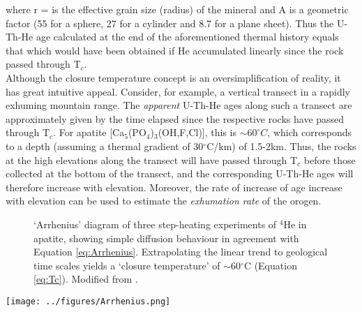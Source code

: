 where r = is the effective grain size (radius) of the mineral and A is
a geometric factor (55 for a sphere, 27 for a cylinder and 8.7 for a
plane sheet). Thus the U-Th-He age calculated at the end of the
aforementioned thermal history equals that which would have been
obtained if He accumulated linearly since the rock passed through
T$_c$.\\

Although the closure temperature concept is an oversimplification of
reality, it has great intuitive appeal. Consider, for example, a
vertical transect in a rapidly exhuming mountain range. The
\emph{apparent} U-Th-He ages along such a transect are approximately
given by the time elapsed since the respective rocks have passed
through T$_c$. For apatite [Ca$_5$(PO$_4$)$_3$(OH,F,Cl)], this is
$\sim 60^{\circ}C$, which corresponds to a depth (assuming a thermal
gradient of 30$^{\circ}$C/km) of 1.5-2km. Thus, the rocks at the high
elevations along the transect will have passed through T$_c$ before
those collected at the bottom of the transect, and the corresponding
U-Th-He ages will therefore increase with elevation. Moreover, the
rate of increase of age increase with elevation can be used to
estimate the \emph{exhumation rate} of the orogen.

\ifpdf
\ifuclnotes
\begin{figure}[!ht]
  \centering
  \def\svgwidth{.9\textwidth}
  
  \caption{`Arrhenius' diagram of three step-heating experiments of
    $^4$He in apatite, showing simple diffusion behaviour in agreement
    with Equation \ref{eq:Arrhenius}. Extrapolating the linear trend
    to geological time scales yields a `closure temperature' of
    $\sim$60$^\circ$C (Equation \ref{eq:Tc}). Modified from
    \citet{braun2006}.}
  \label{fig:Arrhenius}
\end{figure}
\else %
\begin{figure}[!ht]
\noindent\begin{minipage}[t]{.6\textwidth}
\strut\vspace*{-\baselineskip}\newline
\def\svgwidth{\textwidth}

\end{minipage}
\begin{minipage}[t]{.4\textwidth}
  \label{fig:Arrhenius}
\end{minipage}
\end{figure}
\fi %
\else
  \texttt{[image: ../figures/Arrhenius.png]}
  \label{fig:Arrhenius}
\fi

